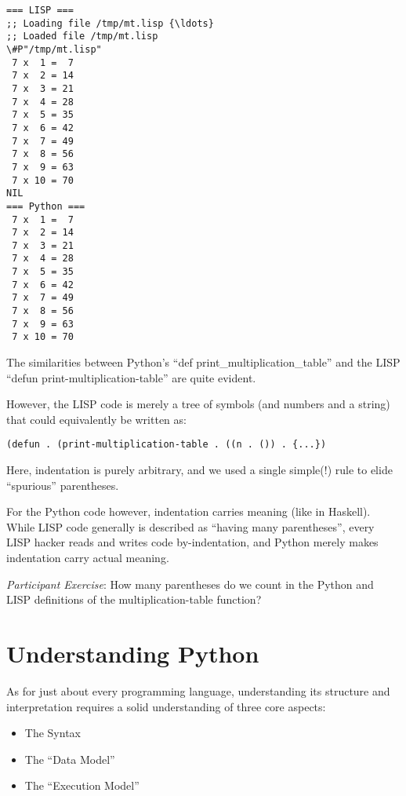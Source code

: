 \documentclass[11pt]{article}
\providecommand{\tightlist}{%
      \setlength{\itemsep}{0pt}\setlength{\parskip}{0pt}}
\begin{document}
    \begin{Verbatim}[commandchars=\\\{\}]
=== LISP ===
;; Loading file /tmp/mt.lisp {\ldots}
;; Loaded file /tmp/mt.lisp
\#P"/tmp/mt.lisp"
 7 x  1 =  7
 7 x  2 = 14
 7 x  3 = 21
 7 x  4 = 28
 7 x  5 = 35
 7 x  6 = 42
 7 x  7 = 49
 7 x  8 = 56
 7 x  9 = 63
 7 x 10 = 70
NIL
=== Python ===
 7 x  1 =  7
 7 x  2 = 14
 7 x  3 = 21
 7 x  4 = 28
 7 x  5 = 35
 7 x  6 = 42
 7 x  7 = 49
 7 x  8 = 56
 7 x  9 = 63
 7 x 10 = 70
    \end{Verbatim}

    The similarities between Python's ``def print\_multiplication\_table''
and the LISP ``defun print-multiplication-table'' are quite evident.

However, the LISP code is merely a tree of symbols (and numbers and a
string) that could equivalently be written as:

\begin{verbatim}
(defun . (print-multiplication-table . ((n . ()) . {...})
\end{verbatim}

Here, indentation is purely arbitrary, and we used a single simple(!)
rule to elide ``spurious'' parentheses.

For the Python code however, indentation carries meaning (like in
Haskell). While LISP code generally is described as ``having many
parentheses'', every LISP hacker reads and writes code by-indentation,
and Python merely makes indentation carry actual meaning.

\emph{Participant Exercise}: How many parentheses do we count in the
Python and LISP definitions of the multiplication-table function?

    \hypertarget{understanding-python}{%
\section{Understanding Python}\label{understanding-python}}

As for just about every programming language, understanding its
structure and interpretation requires a solid understanding of three
core aspects:

\begin{itemize}
\tightlist
\item
  The Syntax
\item
  The ``Data Model''
\item
  The ``Execution Model''
\end{itemize}
\end{document}

